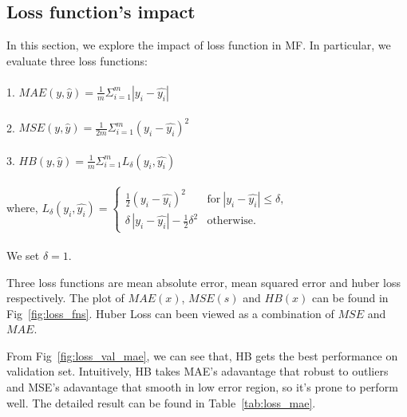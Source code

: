 \documentclass[journal, a4paper]{IEEEtran}
\begin{document}
\subsection{Loss function's impact}
In this section, we explore the impact of loss function in MF. In particular, we evaluate three loss functions: \\ \\
1. $MAE(y, \hat{y}) = \frac{1}{m}\Sigma_{i=1}^{m}|y_i - \hat{y_i}|$ \\ \\
2. $MSE(y, \hat{y}) = \frac{1}{2m}\Sigma_{i=1}^{m}(y_i - \hat{y_i})^2$ \\ \\
3. $HB(y, \hat{y}) = \frac{1}{m}\Sigma_{i=1}^{m}L_{\delta }(y_i, \hat{y_i}) $ \\ \\
where, $ L_{\delta }(y_i,\hat{y_i})={\begin{cases}{\frac  {1}{2}}(y_i-\hat{y_i})^{2}&{\textrm  {for}}~|y_i-\hat{y_i}|\leq \delta ,\\\delta \,|y_i-\hat{y_i}|-{\frac  {1}{2}}\delta ^{2}&{\textrm  {otherwise.}}\end{cases}}$ \\ \\
We set $\delta = 1$. \par
Three loss functions are mean absolute error, mean squared error and huber loss respectively. The plot of $MAE(x)$, $MSE(s)$ and $HB(x)$ can be found in Fig~\ref{fig:loss_fns}. Huber Loss can been viewed as a combination of $MSE$ and $MAE$. \par
From Fig~\ref{fig:loss_val_mae}, we can see that, HB gets the best performance on validation set. Intuitively, HB takes MAE's adavantage that robust to outliers and MSE's adavantage that smooth in low error region, so it's prone to perform well. The detailed result can be found in Table~\ref{tab:loss_mae}. \par
\end{document}
